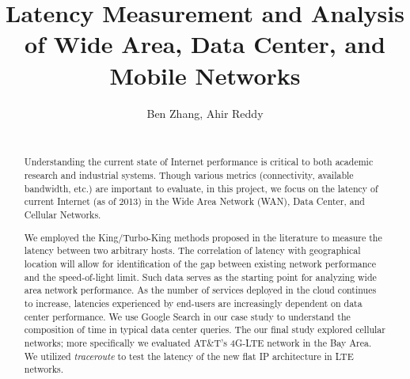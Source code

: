 \documentclass{sig-alternate-10pt}
\begin{document}


\setlength{\paperheight}{11in}
\setlength{\paperwidth}{8.5in}
\setlength{\pdfpageheight}{\paperheight}
\setlength{\pdfpagewidth}{\paperwidth}

\setlength{\textfloatsep}{13pt plus 2pt minus 1pt}

\title{Latency Measurement and Analysis of Wide Area, Data Center, and Mobile Networks}

\author{
{Ben Zhang, Ahir Reddy}\\
\\
}

\maketitle

\begin{abstract}
Understanding the current state of Internet performance is critical to both academic research and industrial systems. Though various metrics (connectivity, available bandwidth, etc.) are important to evaluate, in this project, we focus on the latency of current Internet (as of 2013) in the Wide Area Network (WAN), Data Center, and Cellular Networks.

We employed the King/Turbo-King methods proposed in the literature to measure the latency between two arbitrary hosts. The correlation of latency with geographical location will allow for identification of the gap between existing network performance and the speed-of-light limit. Such data serves as the starting point for analyzing wide area network performance. As the number of services deployed in the cloud continues to increase, latencies experienced by end-users are increasingly dependent on data center performance. We use Google Search in our case study to understand the composition of time in typical data center queries. The our final study explored cellular networks; more specifically we evaluated AT\&T's 4G-LTE network in the Bay Area. We utilized {\it traceroute} to test the latency of the new flat IP architecture in LTE networks.

\end{abstract}
\end{document}
